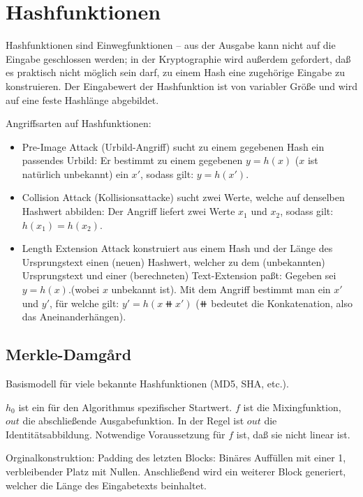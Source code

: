 \chapter{Hashfunktionen}

Hashfunktionen sind Einwegfunktionen -- aus der Ausgabe kann nicht auf die Eingabe geschlossen werden; in der Kryptographie wird außerdem gefordert, daß es praktisch nicht möglich sein darf, zu einem Hash eine zugehörige Eingabe zu konstruieren. Der Eingabewert der Hashfunktion ist von variabler Größe und wird auf eine feste Hashlänge abgebildet.

Angriffsarten auf Hashfunktionen:
\begin{itemize}
\item{Pre-Image Attack (Urbild-Angriff)} sucht zu einem gegebenen Hash ein passendes Urbild: Er bestimmt zu einem gegebenen $y=h(x)$ ($x$ ist natürlich unbekannt) ein $x'$, sodass gilt: $y=h(x')$.
\item{Collision Attack (Kollisionsattacke)} sucht zwei Werte, welche auf denselben Hashwert abbilden: Der Angriff liefert zwei Werte $x_1$ und $x_2$, sodass gilt: $h(x_1)=h(x_2)$.
\item{Length Extension Attack} konstruiert aus einem Hash und der Länge des Ursprungstext einen (neuen) Hashwert, welcher zu dem (unbekannten) Ursprungstext und einer (berechneten) Text-Extension paßt: Gegeben sei $y = h(x)$.(wobei $x$ unbekannt ist). Mit dem Angriff bestimmt man ein $x'$ und $y'$, für welche gilt: $ y' = h(x \doubleplus x')$ ($\doubleplus$ bedeutet die Konkatenation, also das Aneinanderhängen).
\end{itemize}

\section{Merkle-Damgård}

Basismodell für viele bekannte Hashfunktionen (MD5, SHA, etc.).

\begin{center}
\def\svgwidth{0.8\columnwidth}

\end{center}

$h_0$ ist ein für den Algorithmus spezifischer Startwert. $f$ ist die Mixingfunktion, $out$ die abschließende Ausgabefunktion. In der Regel ist $out$ die Identitätsabbildung. Notwendige Voraussetzung für $f$ ist, daß sie nicht linear ist.

Orginalkonstruktion: Padding des letzten Blocks: Binäres Auffüllen mit einer 1, verbleibender Platz mit Nullen. Anschließend wird ein weiterer Block generiert, welcher die Länge des Eingabetexts beinhaltet.

